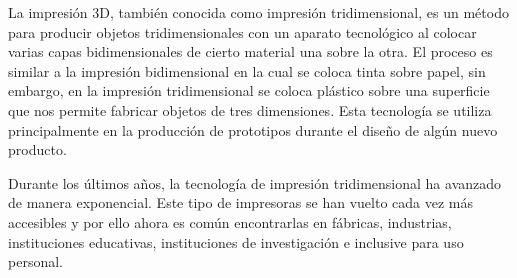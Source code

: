 			\newpage
			\thispagestyle{plain}
			\par \noindent
				La impresión 3D, también conocida como impresión tridimensional, es un método para
				producir objetos tridimensionales con un aparato tecnológico al colocar varias capas
				bidimensionales de cierto material una sobre la otra. El proceso es similar a la impresión
				bidimensional en la cual se coloca tinta sobre papel, sin embargo, en la impresión
				tridimensional se coloca plástico sobre una superficie que nos permite fabricar objetos de tres
				dimensiones. Esta tecnología se utiliza principalmente en la producción de prototipos durante
				el diseño de algún nuevo producto.
			\par \noindent
				Durante los últimos años, la tecnología de impresión tridimensional ha avanzado de
				manera exponencial. Este tipo de impresoras se han vuelto cada vez más accesibles y por ello
				ahora es común encontrarlas en fábricas, industrias, instituciones educativas, instituciones de
				investigación e inclusive para uso personal.
			
